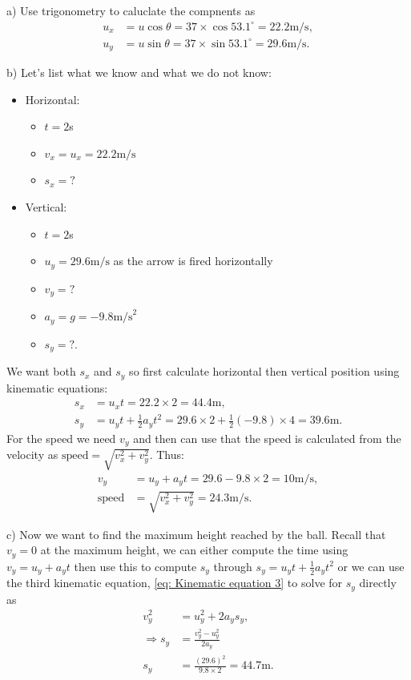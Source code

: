 \documentclass[a4paper,12pt]{book}
\begin{document}
a) Use trigonometry to caluclate the compnents as
\begin{align*}
u_{x}&=u\cos\theta =37\times \cos53.1^{\circ}=22.2 \text{m/s},\\
u_{y}&=u\sin\theta =37\times \sin53.1^{\circ}=29.6 \text{m/s}.
\end{align*}

b) Let's list what we know and what we do not know:
\begin{itemize}
\setlength{\itemsep}{-5pt}
    \item Horizontal:
\begin{itemize}
\setlength{\itemsep}{-5pt}
    \item $t=2$s
\item $v_{x}=u_{x}=22.2\text{m/s}$ 
\item $s_{x}=?$
\end{itemize}
    \item Vertical:
\begin{itemize}
\setlength{\itemsep}{-5pt}
    \item $t=2$s
\item $u_{y}=29.6\text{m/s}$ as the arrow is fired horizontally
\item $v_{y}=?$
\item $a_{y}=g=-9.8\text{m/s}^{2}$
\item $s_{y}=?$.
\end{itemize}
\end{itemize}
We want both $s_{x}$ and $s_{y}$ so first calculate horizontal then vertical position using kinematic equations:
\begin{align*}
s_{x}&=u_{x}t=22.2\times 2=44.4\text{m},\\
s_{y}&=u_{y}t+\frac{1}{2}a_{y}t^{2}=29.6\times 2+\frac{1}{2}(-9.8)\times 4=39.6\text{m}.
\end{align*}
For the speed we need $v_{y}$ and then can use that the speed is calculated from the velocity as $\text{speed}=\sqrt{v^{2}_{x}+v^{2}_{y}}$. Thus:
\begin{align*}
v_{y}&=u_{y}+a_{y}t=29.6-9.8\times 2=10\text{m/s},\\
\text{speed}&=\sqrt{v^{2}_{x}+v^{2}_{y}}=24.3\text{m/s}.
\end{align*}

c) Now we want to find the maximum height reached by the ball. Recall that $v_{y}=0$ at the maximum height, we can either compute the time using $v_{y}=u_{y}+a_{y}t$ then use this to compute $s_{y}$ through $s_{y}=u_{y}t+\frac{1}{2}a_{y}t^{2}$ or we can use the third kinematic equation, \cref{eq: Kinematic equation 3} to solve for $s_{y}$ directly as
\begin{align*}
v^{2}_{y}&=u^{2}_{y}+2a_{y}s_{y},\\
\Rightarrow s_{y}&=\frac{v^{2}_{y}-u^{2}_{y}}{2a_{y}}\\
s_{y}&=\frac{(29.6)^{2}}{9.8\times 2}= 44.7\text{m}.
\end{align*}
\end{document}
